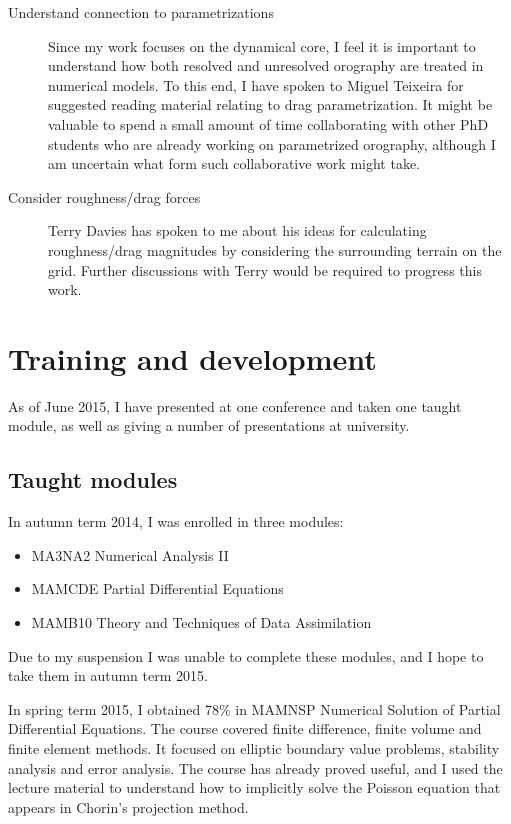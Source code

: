 \documentclass[a4paper]{article}
\begin{document}
\begin{description}
	\item[Understand connection to parametrizations]{Since my work focuses on the dynamical core, I feel it is important to understand how both resolved and unresolved orography are treated in numerical models.  To this end, I have spoken to Miguel Teixeira for suggested reading material relating to drag parametrization.  It might be valuable to spend a small amount of time collaborating with other PhD students who are already working on parametrized orography, although I am uncertain what form such collaborative work might take.}

	\item[Consider roughness/drag forces]{Terry Davies has spoken to me about his ideas for calculating roughness/drag magnitudes by considering the surrounding terrain on the grid.  Further discussions with Terry would be required to progress this work.}
\end{description}

\section{Training and development}
As of June 2015, I have presented at one conference and taken one taught module, as well as giving a number of presentations at university.

\subsection{Taught modules}
In autumn term 2014, I was enrolled in three modules:
\begin{itemize}
	\item MA3NA2 Numerical Analysis II
	\item MAMCDE Partial Differential Equations
	\item MAMB10 Theory and Techniques of Data Assimilation
\end{itemize}
Due to my suspension I was unable to complete these modules, and I hope to take them in autumn term 2015.

In spring term 2015, I obtained 78\% in MAMNSP Numerical Solution of Partial Differential Equations.  The course covered finite difference, finite volume and finite element methods.  It focused on elliptic boundary value problems, stability analysis and error analysis.  The course has already proved useful, and I used the lecture material to understand how to implicitly solve the Poisson equation that appears in Chorin's projection method.
\end{document}
